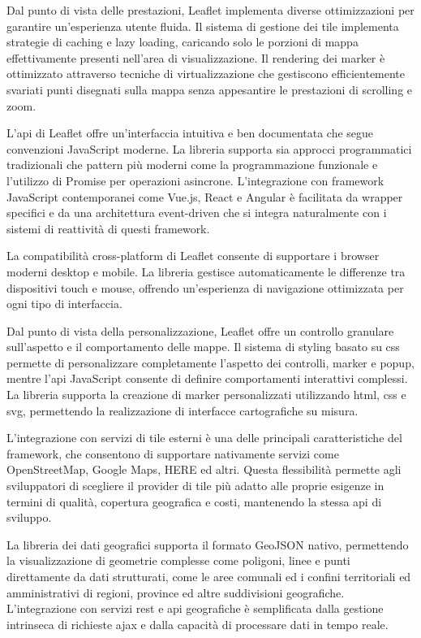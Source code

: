 Dal punto di vista delle prestazioni, Leaflet implementa diverse ottimizzazioni per garantire un'esperienza
utente fluida. Il sistema di gestione dei tile implementa strategie di caching e lazy loading, caricando solo le
porzioni di mappa effettivamente presenti nell'area di visualizzazione. Il rendering dei marker è ottimizzato attraverso
tecniche di virtualizzazione che gestiscono efficientemente svariati punti disegnati sulla mappa senza appesantire
le prestazioni di scrolling e zoom.

L'\acrshort{api} di Leaflet offre un'interfaccia intuitiva e ben documentata che segue convenzioni JavaScript moderne.
La libreria supporta sia approcci programmatici tradizionali che pattern più moderni come la programmazione funzionale e
l'utilizzo di Promise per operazioni asincrone. L'integrazione con framework JavaScript contemporanei come Vue.js,
React e Angular è facilitata da wrapper specifici e da una architettura event-driven che si integra naturalmente con i
sistemi di reattività di questi framework.

La compatibilità cross-platform di Leaflet consente di supportare i browser moderni desktop e mobile.
La libreria gestisce automaticamente le differenze tra dispositivi touch e mouse, offrendo un'esperienza di navigazione
ottimizzata per ogni tipo di interfaccia.

Dal punto di vista della personalizzazione, Leaflet offre un controllo granulare sull'aspetto e il comportamento
delle mappe. Il sistema di styling basato su \acrshort{css} permette di personalizzare completamente l'aspetto
dei controlli, marker e popup, mentre l'\acrshort{api} JavaScript consente di definire
comportamenti  interattivi complessi.
La libreria supporta la creazione di marker personalizzati utilizzando \acrshort{html}, \acrshort{css} e \acrshort{svg},
permettendo la realizzazione di interfacce cartografiche su misura.

L'integrazione con servizi di tile esterni è una delle principali caratteristiche del framework, che consentono di
supportare nativamente servizi come OpenStreetMap, Google Maps, HERE ed altri.
Questa flessibilità permette agli sviluppatori di scegliere il provider di tile più adatto alle proprie esigenze
in termini di qualità, copertura geografica e costi, mantenendo la stessa \acrshort{api} di sviluppo.

La libreria dei dati geografici supporta il formato GeoJSON nativo, permettendo la visualizzazione di geometrie
complesse come poligoni, linee e punti direttamente da dati strutturati, come le aree comunali ed i confini
territoriali ed amministrativi di regioni, province ed altre suddivisioni geografiche.
L'integrazione con servizi \acrshort{rest} e \acrshort{api} geografiche è semplificata dalla gestione intrinseca di
richieste \acrshort{ajax} e dalla capacità di processare dati in tempo reale.

